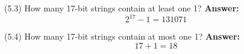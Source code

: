 \documentclass[11pt]{article}
\begin{document}
\noindent
(5.3) How many {\color{red}17}-bit strings contain at least one {\color{red}1}?
\newline
\newline
\noindent
{\bf Answer:}\\
\[2^{17} - 1 = 131071\]
\newline
\newline

\noindent
(5.4) How many {\color{red}17}-bit strings contain at most one {\color{red}1}?
\newline
\newline
\noindent
{\bf Answer:}\\
\[17 + 1 = 18\]
\end{document}

